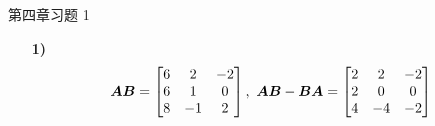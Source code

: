 \begin{problem}
	第四章习题 1

	\begin{solution}
		\begin{enumerate}
			\item[\textbf{1)}]
			$$
			\boldsymbol{A} \boldsymbol{B} = \begin{bmatrix}
				6 & 2 & -2 \\
				6 & 1 & 0 \\
				8 & -1 & 2
			\end{bmatrix},\ \boldsymbol{A} \boldsymbol{B} - \boldsymbol{B} \boldsymbol{A} = \begin{bmatrix}
				2 & 2 & -2 \\
				2 & 0 & 0 \\
				4 & -4 & -2
			\end{bmatrix}
			$$
		\end{enumerate}
	\end{solution}
\end{problem}

